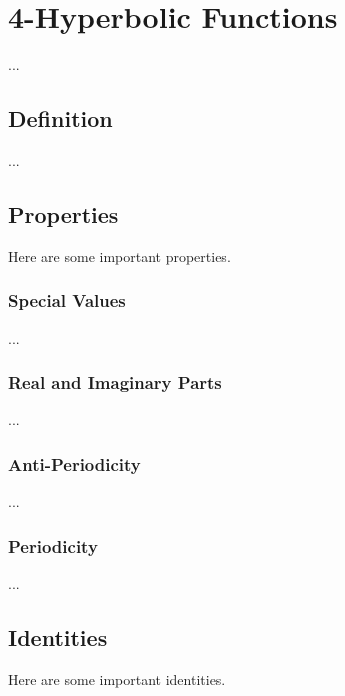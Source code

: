 \chapter{4-Hyperbolic Functions}
...
\section{Definition}
...
\section{Properties}
Here are some important properties.
\subsection{Special Values}
...
\subsection{Real and Imaginary Parts}
...
\subsection{Anti-Periodicity}
...
\subsection{Periodicity}
...
\section{Identities}
Here are some important identities.
